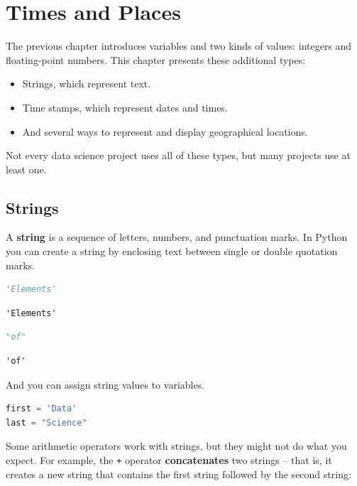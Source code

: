 \hypertarget{times-and-places}{%
\chapter{Times and Places}\label{times-and-places}}

The previous chapter introduces variables and two kinds of values:
integers and floating-point numbers. This chapter presents these
additional types:

\begin{itemize}
\item
  Strings, which represent text.
\item
  Time stamps, which represent dates and times.
\item
  And several ways to represent and display geographical locations.
\end{itemize}

Not every data science project uses all of these types, but many
projects use at least one.

\hypertarget{strings}{%
\section{Strings}\label{strings}}

A \textbf{string} is a sequence of letters, numbers, and punctuation
marks. In Python you can create a string by enclosing text between
single or double quotation marks.

\begin{lstlisting}[language=Python,style=source]
'Elements'
\end{lstlisting}

\begin{lstlisting}[style=output]
'Elements'
\end{lstlisting}

\begin{lstlisting}[language=Python,style=source]
"of"
\end{lstlisting}

\begin{lstlisting}[style=output]
'of'
\end{lstlisting}

And you can assign string values to variables.

\begin{lstlisting}[language=Python,style=source]
first = 'Data'
last = "Science"
\end{lstlisting}

Some arithmetic operators work with strings, but they might not do what
you expect. For example, the \passthrough{\lstinline!+!} operator
\textbf{concatenates} two strings -- that is, it creates a new string
that contains the first string followed by the second string:

